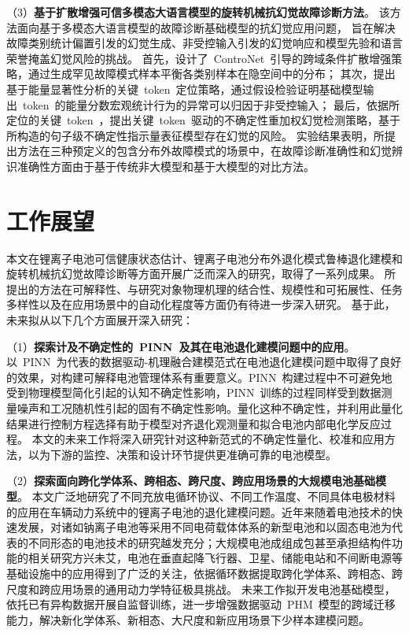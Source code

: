 （3）\textbf{基于扩散增强可信多模态大语言模型的旋转机械抗幻觉故障诊断方法}。
该方法面向基于多模态大语言模型的故障诊断基础模型的抗幻觉应用问题，
旨在解决故障类别统计偏置引发的幻觉生成、非受控输入引发的幻觉响应和模型先验和语言荣誉掩盖幻觉风险的挑战。
首先，设计了~ControNet~引导的跨域条件扩散增强策略，通过生成罕见故障模式样本平衡各类别样本在隐空间中的分布；
其次，提出基于能量显著性分析的关键~token~定位策略，通过假设检验证明基础模型输出~token~的能量分数宏观统计行为的异常可以归因于非受控输入；
最后，依据所定位的关键~token~，提出关键~token~驱动的不确定性重加权幻觉检测策略，基于所构造的句子级不确定性指示量表征模型存在幻觉的风险。
实验结果表明，所提出方法在三种预定义的包含分布外故障模式的场景中，在故障诊断准确性和幻觉辨识准确性方面由于基于传统非大模型和基于大模型的对比方法。

\section{工作展望}

本文在锂离子电池可信健康状态估计、锂离子电池分布外退化模式鲁棒退化建模和旋转机械抗幻觉故障诊断等方面开展广泛而深入的研究，取得了一系列成果。
所提出的方法在可解释性、与研究对象物理机理的结合性、规模性和可拓展性、任务多样性以及在应用场景中的自动化程度等方面仍有待进一步深入研究。
基于此，未来拟从以下几个方面展开深入研究：

（1）\textbf{探索计及不确定性的~PINN~及其在电池退化建模问题中的应用}。
% 
以~PINN~为代表的数据驱动-机理融合建模范式在电池退化建模问题中取得了良好的效果，对构建可解释电池管理体系有重要意义。PINN~构建过程中不可避免地受到物理模型简化引起的认知不确定性影响，PINN~训练的过程同样受到数据测量噪声和工况随机性引起的固有不确定性影响。量化这种不确定性，并利用此量化结果进行控制方程选择有助于模型对齐退化观测量和拟合电池内部电化学反应过程。
本文的未来工作将深入研究针对这种新范式的不确定性量化、校准和应用方法，以为下游的监控、决策和设计环节提供更准确可靠的电池模型。

（2）\textbf{探索面向跨化学体系、跨相态、跨尺度、跨应用场景的大规模电池基础模型}。
% 
本文广泛地研究了不同充放电循环协议、不同工作温度、不同具体电极材料的应用在车辆动力系统中的锂离子电池的退化建模问题。近年来随着电池技术的快速发展，对诸如钠离子电池等采用不同电荷载体体系的新型电池和以固态电池为代表的不同形态的电池技术的研究越发充分；大规模电池成组成包甚至承担结构件功能的相关研究方兴未艾，电池在垂直起降飞行器、卫星、储能电站和不间断电源等基础设施中的应用得到了广泛的关注，依据循环数据提取跨化学体系、跨相态、跨尺度和跨应用场景的通用动力学特征极具挑战。
未来工作拟开发电池基础模型，依托已有异构数据开展自监督训练，进一步增强数据驱动~PHM~模型的跨域迁移能力，解决新化学体系、新相态、大尺度和新应用场景下少样本建模问题。

